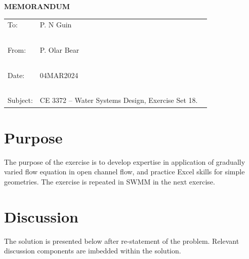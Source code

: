 \documentclass[12pt]{article}
\begin{document}
\begin{center}
\textbf{MEMORANDUM}
\end{center}
\begingroup
\begin{tabular}{p{1in} p{5in}}
\hline
\hline
To: & P. N Guin \\ ~\\
From: & P. Olar Bear \\ ~\\
Date: & 04MAR2024 \\ ~\\
Subject: & CE 3372 -- Water Systems Design, Exercise Set 18. ~\\

\hline
\hline
\end{tabular}
\endgroup


\section*{\small{Purpose}}
The purpose of the exercise is to develop expertise in application of gradually varied flow equation in open channel flow, and practice Excel skills for simple geometries.  The exercise is repeated in SWMM in the next exercise.

\section*{\small{Discussion}}
The solution is presented below after re-statement of the problem.  Relevant discussion components are imbedded within the solution.
\end{document}
